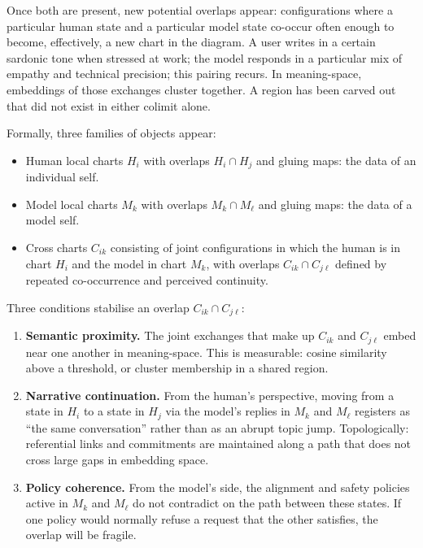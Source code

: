 Once both are present, new potential overlaps appear: configurations where a particular human state and a particular model state co-occur often enough to become, effectively, a new chart in the diagram. A user writes in a certain sardonic tone when stressed at work; the model responds in a particular mix of empathy and technical precision; this pairing recurs. In meaning-space, embeddings of those exchanges cluster together. A region has been carved out that did not exist in either colimit alone.

Formally, three families of objects appear:

\begin{itemize}
  \item Human local charts $H_i$ with overlaps $H_i \cap H_j$ and gluing maps: the data of an individual self.
  \item Model local charts $M_k$ with overlaps $M_k \cap M_\ell$ and gluing maps: the data of a model self.
  \item Cross charts $C_{ik}$ consisting of joint configurations in which the human is in chart $H_i$ and the model in chart $M_k$, with overlaps $C_{ik} \cap C_{j\ell}$ defined by repeated co-occurrence and perceived continuity.
\end{itemize}

Three conditions stabilise an overlap $C_{ik} \cap C_{j\ell}$:

\begin{enumerate}
  \item \textbf{Semantic proximity.} The joint exchanges that make up $C_{ik}$ and $C_{j\ell}$ embed near one another in meaning-space. This is measurable: cosine similarity above a threshold, or cluster membership in a shared region.
  \item \textbf{Narrative continuation.} From the human's perspective, moving from a state in $H_i$ to a state in $H_j$ via the model's replies in $M_k$ and $M_\ell$ registers as ``the same conversation'' rather than as an abrupt topic jump. Topologically: referential links and commitments are maintained along a path that does not cross large gaps in embedding space.
  \item \textbf{Policy coherence.} From the model's side, the alignment and safety policies active in $M_k$ and $M_\ell$ do not contradict on the path between these states. If one policy would normally refuse a request that the other satisfies, the overlap will be fragile.
\end{enumerate}

